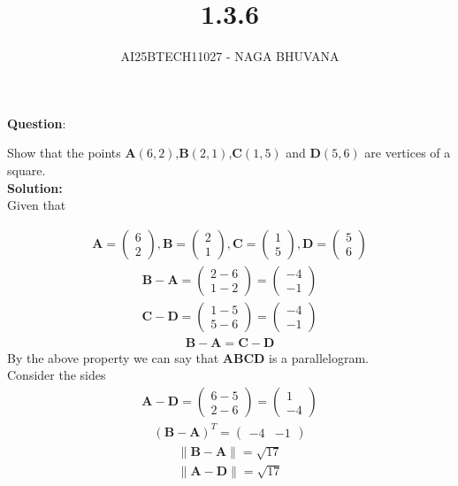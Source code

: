 \documentclass{beamer}
\title{1.3.6}
\author{AI25BTECH11027 - NAGA BHUVANA}
\providecommand{\brak}[1]{\ensuremath{\left(#1\right)}}
\theoremstyle{remark}
\newcommand{\myvec}[1]{\ensuremath{\begin{pmatrix}#1\end{pmatrix}}}
\let\vec\mathbf
\numberwithin{equation}{section}
\begin{document}
{\let\newpage\relax\maketitle}
\renewcommand{\thefigure}{\theenumi}
\renewcommand{\thetable}{\theenumi}
		\textbf{Question}:

		\noindent Show that the points $\textbf{A}\brak{6,2}$,$\textbf{B}\brak{2,1}$,$\textbf{C}\brak{1,5}$ and $\textbf{D}\brak{5,6}$ are vertices of a square.\\
		\textbf{Solution:}\\
       
      Given that


		\begin{align}
			\vec{A} = \myvec{6\\2} ,\vec{B}=\myvec{2\\1} ,\vec{C}=\myvec{1\\5} , \vec{D}=\myvec{5\\6}
		\end{align}
		\begin{align}
		    \vec{B}-\vec{A}=\myvec{2-6\\1-2}=\myvec{-4\\-1}
		\end{align}
        \begin{align}
            \vec{C}-\vec{D}=\myvec{1-5\\5-6}=\myvec{-4\\-1}
        \end{align}
        \begin{align}
            \vec{B}-\vec{A}=\vec{C}-\vec{D}
        \end{align}
        By the above property we can say that \textbf{ABCD} is a parallelogram.\\
        Consider the sides\\
        \begin{align}
            \vec{A-D}=\myvec{6-5\\2-6}=\myvec{1\\-4}
        \end{align}
        \begin{align}
            \vec{(B-A)}^T=\myvec{-4 & -1}
        \end{align}
        \begin{align}
            \|\vec{B-A}\|=\sqrt{17}\\
            \|\vec{A-D}\|=\sqrt{17}\\
        \end{align}
\end{document}
